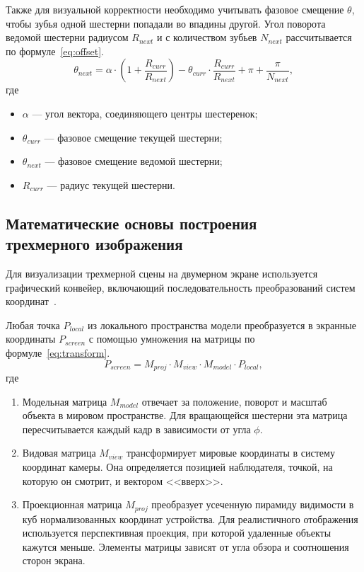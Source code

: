 Также для визуальной корректности необходимо учитывать фазовое смещение $\theta$, чтобы зубья одной шестерни попадали во впадины другой. Угол поворота ведомой шестерни радиусом $R_{next}$ и с количеством зубьев $N_{next}$ рассчитывается по формуле~\eqref{eq:offset}.
\begin{equation}
	\theta_{next} = \alpha \cdot (1 + \frac{R_{curr}}{R_{next}}) - \theta_{curr} \cdot \frac{R_{curr}}{R_{next}} + \pi + \frac{\pi}{N_{next}},
	\label{eq:offset}
\end{equation}
где
\begin{itemize}
	\item $\alpha$ --- угол вектора, соединяющего центры шестеренок;
	\item $\theta_{curr}$ --- фазовое смещение текущей шестерни;
	\item $\theta_{next}$ --- фазовое смещение ведомой шестерни;
	\item $R_{curr}$ --- радиус текущей шестерни.
\end{itemize}

\subsection[Математические основы построения трехмерного изображения]{Математические основы построения \\ трехмерного изображения}

Для визуализации трехмерной сцены на двумерном экране используется графический конвейер, включающий последовательность преобразований систем координат~\cite{foley}.

Любая точка $P_{local}$ из локального пространства модели преобразуется в экранные координаты $P_{screen}$ с помощью умножения на матрицы по формуле~\eqref{eq:transform}.
\begin{equation}
	P_{screen} = M_{proj} \cdot M_{view} \cdot M_{model} \cdot P_{local},
	\label{eq:transform}
\end{equation}
где
\begin{enumerate}
	\item Модельная матрица $M_{model}$ отвечает за положение, поворот и масштаб объекта в мировом пространстве. Для вращающейся шестерни эта матрица пересчитывается каждый кадр в зависимости от угла $\phi$.
	\item Видовая матрица $M_{view}$ трансформирует мировые координаты в систему координат камеры. Она определяется позицией наблюдателя, точкой, на которую он смотрит, и вектором <<вверх>>.
	\item Проекционная матрица $M_{proj}$ преобразует усеченную пирамиду видимости в куб нормализованных координат устройства. Для реалистичного отображения используется перспективная проекция, при которой удаленные объекты кажутся меньше. Элементы матрицы зависят от угла обзора и соотношения сторон экрана.
\end{enumerate}


